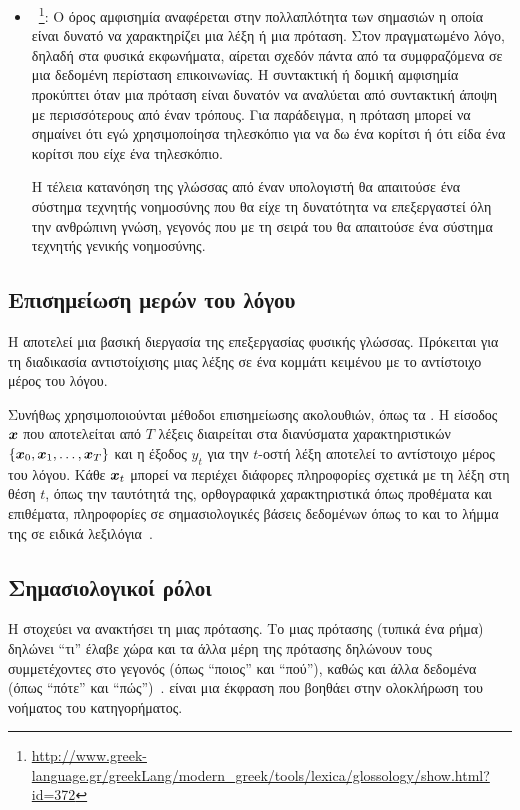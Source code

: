\begin{itemize}
    \item {}~\cite{lexica-glossology}\footnote{\url{http://www.greek-language.gr/greekLang/modern_greek/tools/lexica/glossology/show.html?id=372}}:
          Ο όρος αμφισημία αναφέρεται στην πολλαπλότητα των σημασιών η οποία είναι δυνατό να χαρακτηρίζει μια λέξη ή μια πρόταση.
          Στον πραγματωμένο λόγο, δηλαδή στα φυσικά εκφωνήματα, αίρεται σχεδόν πάντα από τα συμφραζόμενα σε μια δεδομένη περίσταση επικοινωνίας.
          Η συντακτική ή δομική αμφισημία προκύπτει όταν μια πρόταση είναι δυνατόν να αναλύεται από συντακτική άποψη με περισσότερους από έναν τρόπους.
          Για παράδειγμα, η πρόταση  μπορεί να σημαίνει
          ότι εγώ χρησιμοποίησα τηλεσκόπιο για να δω ένα κορίτσι ή ότι είδα ένα κορίτσι που είχε ένα τηλεσκόπιο.

          Η τέλεια κατανόηση της γλώσσας από έναν υπολογιστή θα απαιτούσε ένα σύστημα τεχνητής νοημοσύνης που θα είχε τη δυνατότητα να επεξεργαστεί όλη την ανθρώπινη γνώση,
          γεγονός που με τη σειρά του θα απαιτούσε ένα σύστημα τεχνητής γενικής νοημοσύνης.
\end{itemize}

\subsection{Επισημείωση μερών του λόγου}
Η  αποτελεί μια βασική διεργασία της επεξεργασίας φυσικής γλώσσας.
Πρόκειται για τη διαδικασία αντιστοίχισης μιας λέξης σε ένα κομμάτι κειμένου με το αντίστοιχο μέρος του λόγου.

Συνήθως χρησιμοποιούνται μέθοδοι επισημείωσης ακολουθιών, όπως τα \CRFR{}.
Η είσοδος $\vx$ που αποτελείται από $T$ λέξεις διαιρείται στα διανύσματα χαρακτηριστικών $\{\vx_0,\allowbreak \vx_1,\allowbreak \ldots,\allowbreak \vx_T\}$
και η έξοδος $y_t$ για την $t$-οστή λέξη αποτελεί το αντίστοιχο μέρος του λόγου.
Κάθε $\vx_t$ μπορεί να περιέχει διάφορες πληροφορίες σχετικά με τη λέξη στη θέση $t$,
όπως την ταυτότητά της, ορθογραφικά χαρακτηριστικά όπως προθέματα και επιθέματα, πληροφορίες σε σημασιολογικές βάσεις δεδομένων όπως το  και το λήμμα της σε ειδικά λεξιλόγια~\cite{sutton2012introduction}.

\subsection{Σημασιολογικοί ρόλοι}\label{subsec:srl}
Η  στοχεύει να ανακτήσει τη  μιας πρότασης.
Το  μιας πρότασης (τυπικά ένα ρήμα) δηλώνει \enquote{τι} έλαβε χώρα και τα άλλα μέρη της πρότασης δηλώνουν τους συμμετέχοντες στο γεγονός (όπως \enquote{ποιος} και \enquote{πού}),
καθώς και άλλα δεδομένα (όπως \enquote{πότε} και \enquote{πώς})~\cite{marquez2008semantic}.
 είναι μια έκφραση που βοηθάει στην ολοκλήρωση του νοήματος του κατηγορήματος.

